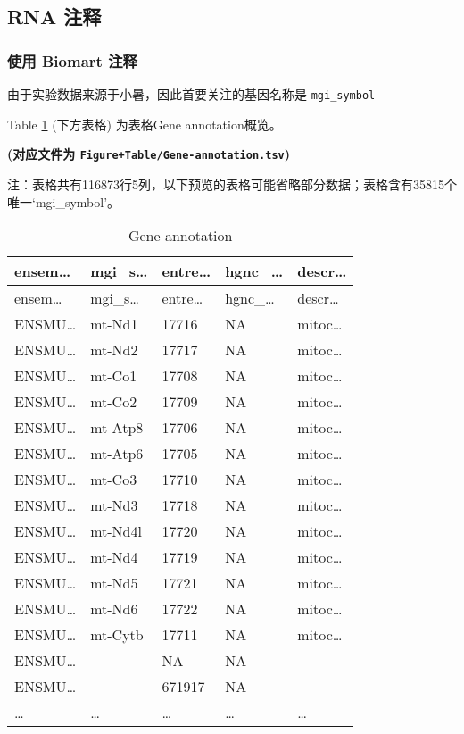 \documentclass[
]{article}
\begin{document}
\hypertarget{rna-ux6ce8ux91ca}{%
\subsection{RNA 注释}\label{rna-ux6ce8ux91ca}}

\hypertarget{ux4f7fux7528-biomart-ux6ce8ux91ca}{%
\subsubsection{使用 Biomart 注释}\label{ux4f7fux7528-biomart-ux6ce8ux91ca}}

由于实验数据来源于小暑，因此首要关注的基因名称是 \texttt{mgi\_symbol}

Table \ref{tab:Gene-annotation} (下方表格) 为表格Gene annotation概览。

\textbf{(对应文件为 \texttt{Figure+Table/Gene-annotation.tsv})}

\begin{center}\begin{tcolorbox}[colback=gray!10, colframe=gray!50, width=0.9\linewidth, arc=1mm, boxrule=0.5pt]注：表格共有116873行5列，以下预览的表格可能省略部分数据；表格含有35815个唯一`mgi\_symbol'。
\end{tcolorbox}
\end{center}

\begin{longtable}[]{@{}lllll@{}}
\caption{\label{tab:Gene-annotation}Gene annotation}\tabularnewline
\toprule
ensem\ldots{} & mgi\_s\ldots{} & entre\ldots{} & hgnc\_\ldots{} & descr\ldots{}\tabularnewline
\midrule
\endfirsthead
\toprule
ensem\ldots{} & mgi\_s\ldots{} & entre\ldots{} & hgnc\_\ldots{} & descr\ldots{}\tabularnewline
\midrule
\endhead
ENSMU\ldots{} & mt-Nd1 & 17716 & NA & mitoc\ldots{}\tabularnewline
ENSMU\ldots{} & mt-Nd2 & 17717 & NA & mitoc\ldots{}\tabularnewline
ENSMU\ldots{} & mt-Co1 & 17708 & NA & mitoc\ldots{}\tabularnewline
ENSMU\ldots{} & mt-Co2 & 17709 & NA & mitoc\ldots{}\tabularnewline
ENSMU\ldots{} & mt-Atp8 & 17706 & NA & mitoc\ldots{}\tabularnewline
ENSMU\ldots{} & mt-Atp6 & 17705 & NA & mitoc\ldots{}\tabularnewline
ENSMU\ldots{} & mt-Co3 & 17710 & NA & mitoc\ldots{}\tabularnewline
ENSMU\ldots{} & mt-Nd3 & 17718 & NA & mitoc\ldots{}\tabularnewline
ENSMU\ldots{} & mt-Nd4l & 17720 & NA & mitoc\ldots{}\tabularnewline
ENSMU\ldots{} & mt-Nd4 & 17719 & NA & mitoc\ldots{}\tabularnewline
ENSMU\ldots{} & mt-Nd5 & 17721 & NA & mitoc\ldots{}\tabularnewline
ENSMU\ldots{} & mt-Nd6 & 17722 & NA & mitoc\ldots{}\tabularnewline
ENSMU\ldots{} & mt-Cytb & 17711 & NA & mitoc\ldots{}\tabularnewline
ENSMU\ldots{} & & NA & NA &\tabularnewline
ENSMU\ldots{} & & 671917 & NA &\tabularnewline
\ldots{} & \ldots{} & \ldots{} & \ldots{} & \ldots{}\tabularnewline
\bottomrule
\end{longtable}
\end{document}
